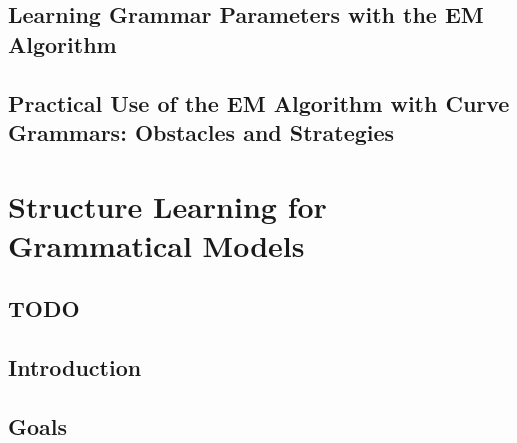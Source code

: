 \documentclass{tufte-book}
\begin{document}
  \section{Learning Grammar Parameters with the EM Algorithm}

    
    


    

  \section{Practical Use of the EM Algorithm with Curve Grammars:
    Obstacles and Strategies}

    


%     

\chapter{Structure Learning for Grammatical Models}

  \section{TODO}
      

  \section{Introduction}
    

  \section{Goals}
    
\end{document}
